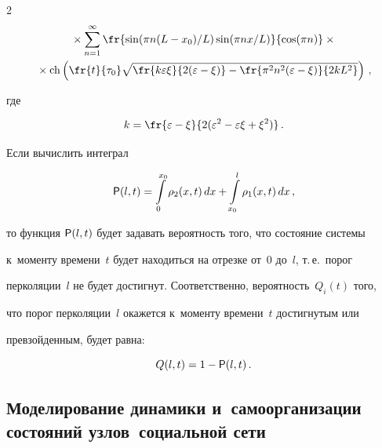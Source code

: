\begin{multicols}{2}
\begin{multline*}
  {}\times \sum\limits^\infty_{n=1} \fr{\sin (\pi 


n (L-x_0)/L)\sin (\pi n x/L)}{\cos (\pi n)}\times{}\\


{}\times \mathrm{ch} 


\left(\fr{t}{\tau_0}\sqrt{\fr{k\varepsilon\xi}{2(\varepsilon-\xi)}- \fr{\pi^2 n^2 


(\varepsilon-\xi)}{2kL^2}}\right)\,,


  \end{multline*}


где 


$$


k=\fr{\varepsilon -\xi}{2(\varepsilon^2 -\varepsilon\xi +\xi^2)}\,.


$$ 


Если вычислить интеграл 


\begin{equation}


{\sf P}(l,t)=\int\limits_0^{x_0} \rho_2(x,t)\,dx+\int\limits^l_{x_0}\rho_1(x,t)\,dx\,,


\label{e4-hv}


\end{equation}


то функция ${\sf P}(l,t)$ будет задавать вероятность того, что состояние системы 


к~моменту времени~$t$ будет находиться на отрезке от~0 до~$l$, т.\,е.\ порог 


перколяции~$l$ не будет достигнут. Соответственно, вероятность~$Q_i(t)$ того, 


что порог перколяции~$l$ окажется к~моменту времени~$t$ достигнутым или 


превзойденным, будет равна:


\begin{equation}


Q(l,t)=1-{\sf P}(l,t)\,.


\label{e5-hv}


\end{equation}





\vspace*{-12pt}





\subsection{Моделирование динамики и~самоорганизации состояний узлов~социальной сети}






\end{multicols}
